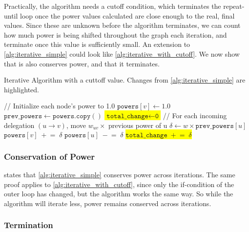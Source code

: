 Practically, the algorithm needs a cutoff condition, which terminates the repeat-until loop once the power values calculated are close enough to the real, final values. Since these are unknown before the algorithm terminates, we can count how much power is being shifted throughout the graph each iteration, and terminate once this value is sufficiently small. An extension to \cref{alg:iterative_simple} could look like \cref{alg:iterative_with_cutoff}. We now show that is also conserves power, and that it terminates.

\begin{algorithm} [t]
 \caption{Iterative Algorithm with a cuttoff value. Changes from \cref{alg:iterative_simple} are highlighted.}\label{alg:iterative_with_cutoff}
\begin{algorithmic}
\State // Initialize each node’s power to 1.0  
    \State \(\texttt{powers}[v] \gets 1.0\)
\EndFor
\Repeat
    \State \(\texttt{prev\_powers} \gets \texttt{powers}.\texttt{copy}()\) 
    \State \colorbox{yellow}{\(\texttt{total\_change} \gets \texttt{0}\)} 
        \State // For each incoming delegation \((u \to v)\), move \(w_{uv}\times\) previous power of u
            \State \(\delta \gets w \times \texttt{prev\_powers}[u]\)
            \State \(\texttt{powers}[v] \;+\!=\; \delta\)
            \State \(\texttt{powers}[u] \;-\!=\; \delta\)
            \State \colorbox{yellow}{\(\texttt{total\_change} \;+\!=\; \delta \)}
        \EndFor
    \EndFor
{}
\end{algorithmic}
\end{algorithm}

\subsubsection{Conservation of Power}

 states that \cref{alg:iterative_simple} conserves power across iterations. The same proof applies to \cref{alg:iterative_with_cutoff}, since only the if-condition of the outer loop has changed, but the algorithm works the same way. So while the algorithm will iterate less, power remains conserved across iterations.

\subsubsection{Termination}

